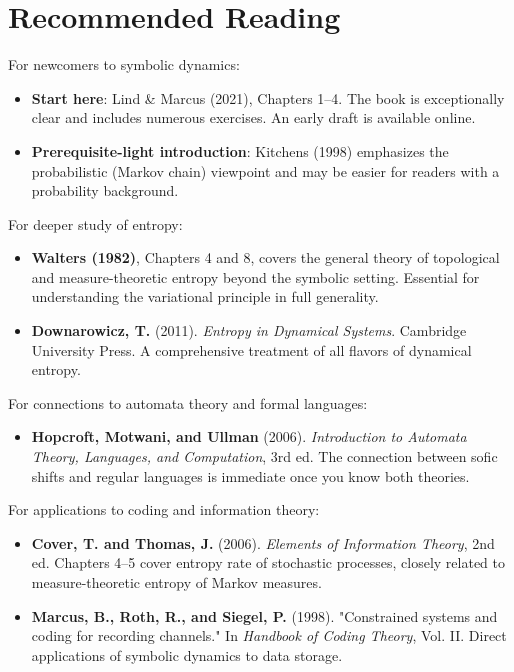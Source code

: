 \section{Recommended Reading}

For newcomers to symbolic dynamics:

\begin{itemize}
\item \textbf{Start here}: Lind \& Marcus (2021), Chapters 1--4. The book is exceptionally clear and includes numerous exercises. An early draft is available online.
\end{itemize}

\begin{itemize}
\item \textbf{Prerequisite-light introduction}: Kitchens (1998) emphasizes the probabilistic (Markov chain) viewpoint and may be easier for readers with a probability background.
\end{itemize}

For deeper study of entropy:

\begin{itemize}
\item \textbf{Walters (1982)}, Chapters 4 and 8, covers the general theory of topological and measure-theoretic entropy beyond the symbolic setting. Essential for understanding the variational principle in full generality.
\end{itemize}

\begin{itemize}
\item \textbf{Downarowicz, T.} (2011). \textit{Entropy in Dynamical Systems}. Cambridge University Press. A comprehensive treatment of all flavors of dynamical entropy.
\end{itemize}

For connections to automata theory and formal languages:

\begin{itemize}
\item \textbf{Hopcroft, Motwani, and Ullman} (2006). \textit{Introduction to Automata Theory, Languages, and Computation}, 3rd ed. The connection between sofic shifts and regular languages is immediate once you know both theories.
\end{itemize}

For applications to coding and information theory:

\begin{itemize}
\item \textbf{Cover, T. and Thomas, J.} (2006). \textit{Elements of Information Theory}, 2nd ed. Chapters 4--5 cover entropy rate of stochastic processes, closely related to measure-theoretic entropy of Markov measures.
\end{itemize}

\begin{itemize}
\item \textbf{Marcus, B., Roth, R., and Siegel, P.} (1998). "Constrained systems and coding for recording channels." In \textit{Handbook of Coding Theory}, Vol. II. Direct applications of symbolic dynamics to data storage.
\end{itemize}
